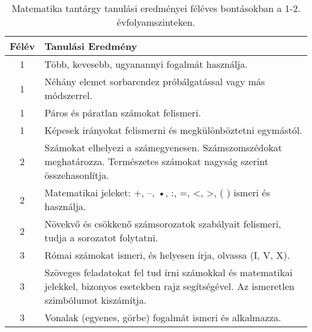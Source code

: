        
           \begin{longtable}{c | p{12cm} }
            \caption[Matematika 1-2.]{Matematika tantárgy tanulási eredményei féléves bontásokban a 1-2. évfolyamszinteken. }  \\

            \textbf{Félév} & \textbf{Tanulási Eredmény} \\
            \hline
            \endhead
                                
                                          1 &  Több, kevesebb, ugyanannyi fogalmát használja. \\ \hline
                                          1 &  Néhány elemet sorbarendez próbálgatással vagy más módszerrel. \\ \hline
                                          1 &  Páros és páratlan számokat felismeri. \\ \hline
                                          1 &  Képesek irányokat felismerni és megkülönböztetni egymástól. \\ \hline
                                      
                                
                                          2 &  Számokat elhelyezi a számegyenesen. Számszomszédokat meghatározza. Természetes számokat nagyság szerint összehasonlítja. \\ \hline
                                          2 &  Matematikai jeleket: +, –, •, :, =, <, >, ( ) ismeri és használja. \\ \hline
                                          2 &  Növekvő és csökkenő számsorozatok szabályait felismeri, tudja a sorozatot folytatni. \\ \hline
                                      
                                
                                          3 &  Római számokat ismeri, és helyesen írja, olvassa (I, V, X). \\ \hline
                                          3 &  Szöveges feladatokat fel tud írni számokkal és matematikai jelekkel, bizonyos esetekben rajz segítségével. Az ismeretlen szimbólumot kiszámítja. \\ \hline
                                          3 &  Vonalak (egyenes, görbe) fogalmát ismeri és alkalmazza. \\ \hline
                                      

\end{longtable}
